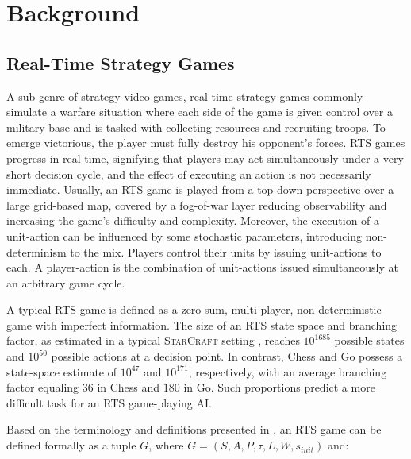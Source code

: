 \documentclass[conference]{IEEEtran}
\begin{document}

\section{Background}
\label{sec:background}

\subsection{Real-Time Strategy Games}

A sub-genre of strategy video games, real-time strategy games commonly simulate a warfare situation where each side of the game is given control over a military base and is tasked with collecting resources and recruiting troops.
 To emerge victorious, the player must fully destroy his opponent's forces. RTS games progress in real-time, signifying that players may act simultaneously under a very short decision cycle, and the effect of executing an action is not necessarily immediate. Usually, an RTS game is played from a top-down perspective over a large grid-based map, covered by a fog-of-war layer reducing observability and increasing the game's difficulty and complexity. Moreover, the execution of a unit-action can be influenced by some stochastic parameters,
 introducing non-determinism to the mix. Players control their units by issuing unit-actions to each. A player-action is the combination of unit-actions issued simultaneously at an arbitrary game cycle.
 

A typical RTS game is defined as a zero-sum, multi-player, non-deterministic game with imperfect information. The size of an RTS state space and branching factor, as estimated in a typical \textsc{StarCraft} setting \cite{ontanon_survey_2013}, reaches $10^{1685}$ possible states and $10^{50}$ possible actions at a decision point. In contrast, Chess and Go possess a state-space estimate of $10^{47}$ and $10^{171}$, respectively, with an average branching factor equaling $36$ in Chess and $180$ in Go. Such proportions predict a more difficult task for an RTS game-playing AI.

Based on the terminology and definitions presented in \cite{ontanon_combinatorial_2017}, an RTS game can be defined formally as a tuple $G$, where $G = (S, A, P, \tau, L, W, s_{init})$ and:
\end{document}
